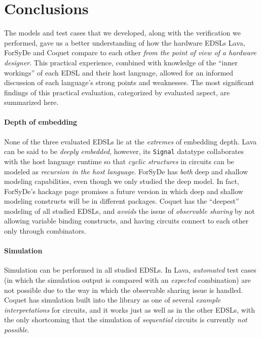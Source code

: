 \section{Conclusions}
\label{sec:conclusions}

    The models and test cases that we developed, along with the verification we performed, gave us
    a better understanding of how the hardware \acp{EDSL} Lava, ForSyDe and Coquet compare to each other
    \emph{from the point of view of a hardware designer}. This practical experience, combined with
    knowledge of the ``inner workings'' of each \ac{EDSL} and their host language, allowed for an
    informed discussion of each language's strong points and weaknesses. The most significant
    findings of this practical evaluation, categorized by evaluated aspect, are summarized here.

    \paragraph{Depth of embedding}
        None of the three evaluated \acp{EDSL} lie at the \emph{extremes} of embedding depth. Lava can be
        said to be \emph{deeply embedded}, however, its \texttt{Signal} datatype collaborates with
        the host language runtime so that \emph{cyclic structures} in circuits can be modeled as
        \emph{recursion in the host language}. ForSyDe has \emph{both} deep and shallow modeling
        capabilities, even though we only studied the deep model. In fact, ForSyDe's hackage
        page\cite{website:forsyde-hackage} promises a future version in which deep and shallow
        modeling constructs will be in different packages. Coquet has the ``deepest'' modeling of
        all studied \acp{EDSL}, and \emph{avoids} the issue of \emph{observable sharing} by not allowing
        variable binding constructs, and having circuits connect to each other only through
        combinators.

    \paragraph{Simulation}
        Simulation can be performed in all studied \acp{EDSL}. In Lava, \emph{automated} test cases (in
        which the simulation output is compared with an \emph{expected} combination) are not
        possible due to the way in which the observable sharing issue is handled. Coquet has
        simulation built into the library as one of several \emph{example interpretations} for
        circuits, and it works just as well as in the other \acp{EDSL}, with the only shortcoming that
        the simulation of \emph{sequential} circuits is currently \emph{not possible}.

